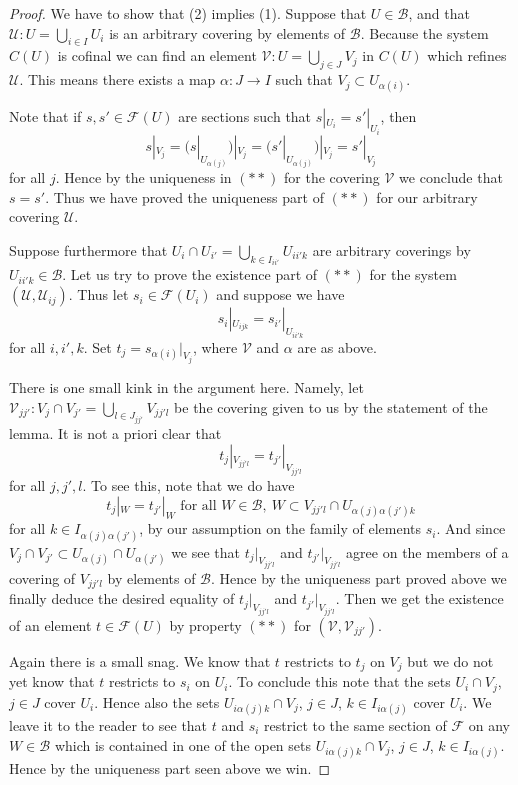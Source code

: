 \begin{proof}
We have to show that (2) implies (1).
Suppose that $U \in \mathcal{B}$, and that
$\mathcal{U} : U = \bigcup_{i\in I} U_i$ is an arbitrary covering
by elements of $\mathcal{B}$.  Because the system $C(U)$ is cofinal
we can find an element $\mathcal{V} : U = \bigcup_{j \in J} V_j$
in $C(U)$ which refines $\mathcal{U}$. This means there exists
a map $\alpha : J \to I$ such that $V_j \subset U_{\alpha(i)}$.

\medskip\noindent
Note that if $s, s' \in \mathcal{F}(U)$ are sections such
that $s|_{U_i} = s'|_{U_i}$, then
$$
s|_{V_j}
= (s|_{U_{\alpha(j)}})|_{V_j}
= (s'|_{U_{\alpha(j)}})|_{V_j}
= s'|_{V_j}
$$
for all $j$. Hence by the uniqueness in $(**)$
for the covering $\mathcal{V}$ we conclude that $s = s'$.
Thus we have proved the uniqueness part of $(**)$
for our arbitrary covering $\mathcal{U}$.

\medskip\noindent
Suppose furthermore that $U_i \cap U_{i'} = \bigcup_{k \in I_{ii'}} U_{ii'k}$
are arbitrary coverings by $U_{ii'k} \in \mathcal{B}$.
Let us try to prove the existence part of $(**)$ for the system
$(\mathcal{U}, \mathcal{U}_{ij})$. Thus let $s_i \in \mathcal{F}(U_i)$
and suppose we have
$$
s_i|_{U_{ijk}} = s_{i'}|_{U_{ii'k}}
$$
for all $i,i',k$. Set $t_j = s_{\alpha(i)}|_{V_j}$, where $\mathcal{V}$
and $\alpha$ are as above.

\medskip\noindent
There is one small kink in the argument here. Namely, let
$\mathcal{V}_{jj'} : V_j \cap V_{j'} = \bigcup_{l \in J_{jj'}} V_{jj'l}$
be the covering given to us by the statement of the lemma.
It is not a priori clear that
$$
t_j|_{V_{jj'l}} = t_{j'}|_{V_{jj'l}}
$$
for all $j,j',l$. To see this, note that we do have
$$
t_j|_W = t_{j'}|_W \text{ for all } W \in \mathcal{B},\ 
W \subset V_{jj'l} \cap U_{\alpha(j)\alpha(j')k}
$$
for all $k \in I_{\alpha(j)\alpha(j')}$, by our assumption on
the family of elements $s_i$. And since
$V_j \cap V_{j'} \subset U_{\alpha(j)} \cap U_{\alpha(j')}$
we see that $t_j|_{V_{jj'l}}$ and $t_{j'}|_{V_{jj'l}}$
agree on the members of a covering of $V_{jj'l}$ by
elements of $\mathcal{B}$. Hence by the uniqueness part proved above
we finally deduce the desired equality of
$t_j|_{V_{jj'l}}$ and $t_{j'}|_{V_{jj'l}}$.
Then we get the existence of an element $t \in \mathcal{F}(U)$
by property $(**)$ for $(\mathcal{V}, \mathcal{V}_{jj'})$.

\medskip\noindent
Again there is a small snag. We know that $t$ restricts to $t_j$ on $V_j$
but we do not yet know that $t$ restricts to $s_i$ on $U_i$. To conclude
this note that the sets $U_i \cap V_j$, $j \in J$ cover $U_i$. Hence
also the sets $U_{i \alpha(j) k} \cap V_j$, $j\in J$, $k \in I_{i\alpha(j)}$
cover $U_i$. We leave it to the reader to see that $t$ and $s_i$ restrict
to the same section of $\mathcal{F}$ on any $W \in \mathcal{B}$
which is contained in one of the open sets
$U_{i \alpha(j) k} \cap V_j$, $j\in J$, $k \in I_{i\alpha(j)}$.
Hence by the uniqueness part seen above we win.
\end{proof}

